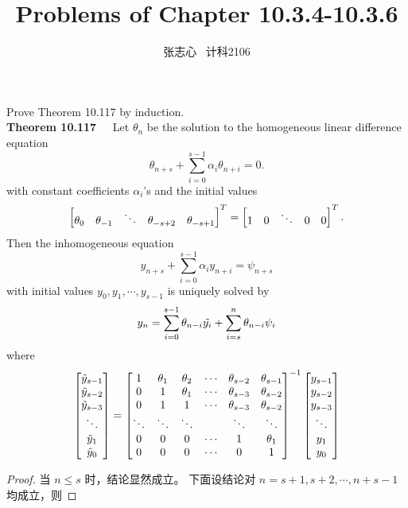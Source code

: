 \documentclass[lang=cn,a4paper,newtx,bibend=bibtex]{elegantpaper}
\title{Problems of Chapter 10.3.4-10.3.6}
\author{张志心 \ 计科2106}
\date{\zhdate{2024/04/23}}
\begin{document}
\maketitle

\begin{prob}[Exercise 10.118]
  Prove Theorem 10.117 by induction.\\
  \textbf{Theorem 10.117~~} Let $\theta_n$ be the solution to the homogeneous
  linear difference equation
  \[
    \theta_{n+s} + \sum\limits_{i = 0}^{s - 1} \alpha_i \theta_{n+i} = 0.
  \]
  with constant coefficients $\alpha_i$'s and the initial values
  \[
    \begin{bmatrix} \theta_0 & \theta_{-1} & \ddots & \theta_{-s+2} & \theta_{-s+1} \end{bmatrix}^T
    =
    \begin{bmatrix} 1 & 0 & \ddots & 0 & 0 \end{bmatrix}^T.
  \]
  Then the inhomogeneous equation
  \[
    y_{n+s} + \sum\limits_{i = 0}^{s - 1} \alpha_{i} y_{n+i} = \psi_{n+s}
  \]
  with initial values $y_0, y_1, \cdots, y_{s-1}$ is uniquely solved by
  \[
    y_n = \sum\limits_{i=0}^{s-1}\theta_{n-i} \tilde{y_i} + \sum\limits_{i=s}^n \theta_{n-i} \psi_i
  \]
  where 
  \[
    \begin{bmatrix} \tilde{y}_{s-1} \\ \tilde{y}_{s-2} \\ \tilde{y}_{s-3} \\ \ddots \\ \tilde{y}_{1} \\ \tilde{y}_0 \end{bmatrix}
    =
    \begin{bmatrix} 
      1 & \theta_1 & \theta_2 & \cdots & \theta_{s-2} & \theta_{s-1} \\
      0 & 1 & \theta_1 & \cdots & \theta_{s-3} & \theta_{s-2} \\
      0 & 1 & 1 & \cdots & \theta_{s-3} & \theta_{s-2} \\
      \ddots & \ddots & \ddots & & \ddots & \ddots \\
      0 & 0 & 0 & \cdots & 1 & \theta_1 \\
      0 & 0 & 0 & \cdots & 0 & 1
     \end{bmatrix}^{-1} 
    \begin{bmatrix} 
      y_{s-1} \\ y_{s-2} \\ y_{s-3} \\ \ddots \\ y_1 \\ y_0
     \end{bmatrix}
  \]
\end{prob}

\begin{proof}
  当 $n \le s$ 时，结论显然成立。
  下面设结论对 $n = s+1, s+2, \cdots, n+s-1$ 均成立，则
\end{proof}
\end{document}
